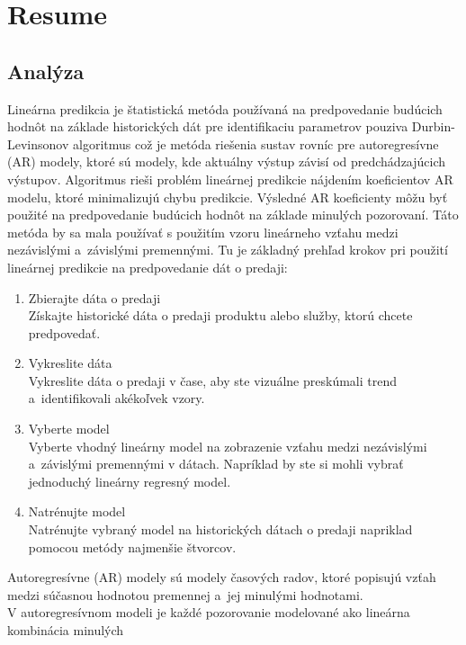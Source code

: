 \chapter{Resume} \label{resume}
    \section{Analýza} \label{sk:analytic}
    Lineárna predikcia je štatistická metóda používaná na predpovedanie budúcich hodnôt na základe historických dát pre
    identifikaciu parametrov pouziva Durbin-Levinsonov algoritmus což je metóda riešenia sustav rovníc pre
    autoregresívne (AR) modely, ktoré sú modely, kde aktuálny výstup závisí od predchádzajúcich výstupov. Algoritmus
    rieši problém lineárnej predikcie nájdením koeficientov AR modelu, ktoré minimalizujú chybu predikcie. Výsledné AR
    koeficienty môžu byť použité na predpovedanie budúcich hodnôt na základe minulých pozorovaní. Táto metóda by sa mala
    používať s použitím vzoru lineárneho vzťahu medzi nezávislými a~závislými premennými. Tu je základný prehľad krokov
    pri použití lineárnej predikcie na predpovedanie dát o predaji:\\
    \begin{enumerate}
        \item Zbierajte dáta o predaji\\
        Získajte historické dáta o predaji produktu alebo služby, ktorú chcete predpovedať.
        \item Vykreslite dáta\\
        Vykreslite dáta o predaji v čase, aby ste vizuálne preskúmali trend\\a~identifikovali akékoľvek vzory.
        \item Vyberte model\\
        Vyberte vhodný lineárny model na zobrazenie vzťahu medzi nezávislými a~závislými
        premennými v dátach. Napríklad by ste si mohli vybrať jednoduchý lineárny regresný model.
        \item Natrénujte model\\
        Natrénujte vybraný model na historických dátach o predaji napriklad pomocou metódy najmenšie štvorcov.
    \end{enumerate}
    Autoregresívne (AR) modely sú modely časových radov, ktoré popisujú vzťah medzi súčasnou hodnotou premennej a~jej
    minulými hodnotami.\\V autoregresívnom modeli je každé pozorovanie modelované ako lineárna kombinácia minulých
